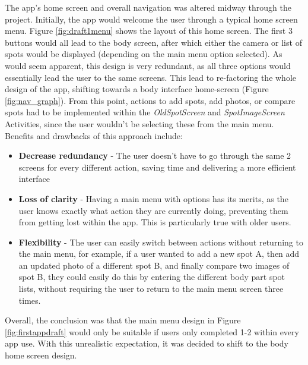 The app's home screen and overall navigation was altered midway through the project. Initially, the app would welcome the user through a typical home screen menu. Figure \ref{fig:draft1menu} shows the layout of this home screen. The first 3 buttons would all lead to the body screen, after which either the camera or list of spots would be displayed (depending on the main menu option selected). As would seem apparent, this design is very redundant, as all three options would essentially lead the user to the same screens. This lead to re-factoring the whole design of the app, shifting towards a body interface home-screen (Figure \ref{fig:nav_graph}). From this point, actions to add spots, add photos, or compare spots had to be implemented within the \emph{OldSpotScreen} and \emph{SpotImageScreen} Activities, since the user wouldn't be selecting these from the main menu. Benefits and drawbacks of this approach include:
\begin{itemize}
    \item \textbf{Decrease redundancy} - The user doesn't have to go through the same 2 screens for every different action, saving time and delivering a more efficient interface 
    \item \textbf{Loss of clarity} - Having a main menu with options has its merits, as the user knows exactly what action they are currently doing, preventing them from getting lost within the app. This is particularly true with older users.
    \item \textbf{Flexibility} - The user can easily switch between actions without returning to the main menu, for example, if a user wanted to add a new spot A, then  add an updated photo of a different spot B, and finally compare two images of spot B, they could easily do this by entering the different body part spot lists, without requiring the user to return to the main menu screen three times.
\end{itemize}
Overall, the conclusion was that the main menu design in Figure \ref{fig:firstappdraft} would only be suitable if users only completed 1-2 within every app use. With this unrealistic expectation, it was decided to shift to the body home screen design.
\clearpage
